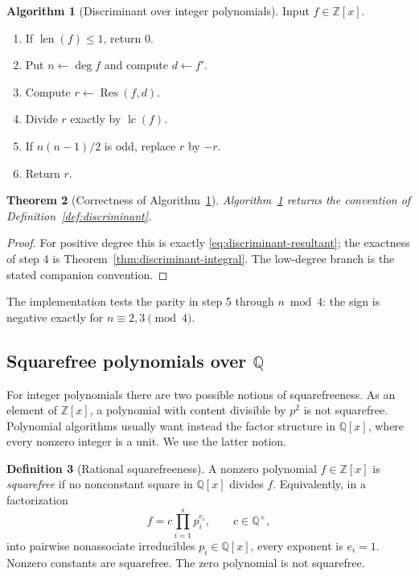 \documentclass[11pt]{book}
\newtheorem{theorem}{Theorem}[section]
\theoremstyle{definition}
\newtheorem{algorithm}[theorem]{Algorithm}
\newtheorem{definition}[theorem]{Definition}
\newcommand{\ZZ}{\mathbb Z}
\newcommand{\len}{\operatorname{len}}
\begin{document}
\begin{algorithm}[Discriminant over integer polynomials]\label{alg:zz-discriminant}
Input $f\in\ZZ[x]$.
\begin{enumerate}
 \item If $\len(f)\le1$, return $0$.
 \item Put $n\leftarrow\deg f$ and compute $d\leftarrow f'$.
 \item Compute $r\leftarrow\operatorname{Res}(f,d)$.
 \item Divide $r$ exactly by $\operatorname{lc}(f)$.
 \item If $n(n-1)/2$ is odd, replace $r$ by $-r$.
 \item Return $r$.
\end{enumerate}
\end{algorithm}

\begin{theorem}[Correctness of Algorithm~\ref{alg:zz-discriminant}]
Algorithm~\ref{alg:zz-discriminant} returns the convention of
Definition~\ref{def:discriminant}.
\end{theorem}

\begin{proof}
For positive degree this is exactly
\eqref{eq:discriminant-resultant}; the exactness of step 4 is
Theorem~\ref{thm:discriminant-integral}.  The low-degree branch is the stated
companion convention.
\end{proof}

The implementation tests the parity in step 5 through $n\bmod4$: the sign is
negative exactly for $n\equiv2,3\pmod4$.

\subsection{Squarefree polynomials over $\mathbb Q$}

For integer polynomials there are two possible notions of squarefreeness.  As
an element of $\ZZ[x]$, a polynomial with content divisible by $p^2$ is not
squarefree.  Polynomial algorithms usually want instead the factor structure
in $\mathbb Q[x]$, where every nonzero integer is a unit.  We use the latter
notion.

\begin{definition}[Rational squarefreeness]\label{def:rational-squarefree}
A nonzero polynomial $f\in\ZZ[x]$ is \emph{squarefree} if no nonconstant
square in $\mathbb Q[x]$ divides $f$.  Equivalently, in a factorization
\[
 f=c\prod_{i=1}^s p_i^{e_i},
 \qquad c\in\mathbb Q^\times,
\]
into pairwise nonassociate irreducibles $p_i\in\mathbb Q[x]$, every exponent
is $e_i=1$.  Nonzero constants are squarefree.  The zero polynomial is not
squarefree.
\end{definition}
\end{document}

